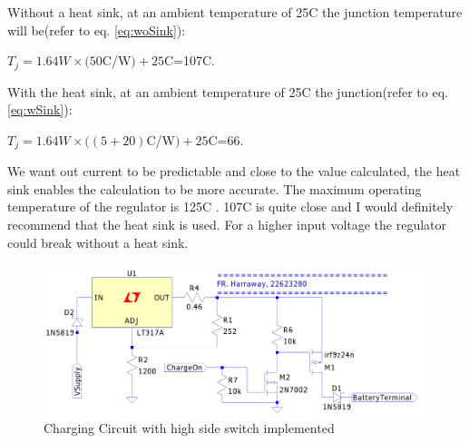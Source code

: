 Without a heat sink, at an ambient temperature of 25\textdegree C the junction temperature will be(refer to eq. \ref{eq:woSink}):

\begin{center}
$T_j=1.64W\times(50$\textdegree C/W$)+25$\textdegree C=107\textdegree C. 
\end{center}

With the heat sink, at an ambient temperature of 25\textdegree C the junction(refer to eq. \ref{eq:wSink}):
\begin{center}
    $T_j=1.64W\times((5+20)$\textdegree C/W$)+25$\textdegree C=66\textdegree.
\end{center}

We want out current to be predictable and close to the value calculated, the heat sink enables the calculation to be more accurate. The maximum operating temperature of the regulator is 125\textdegree C \cite{STM}. 107\textdegree C is quite close and I would definitely recommend that the heat sink is used. For a higher input voltage the regulator could break without a heat sink. 


\begin{figure}[!htb]
\centering
\includegraphics[scale=0.18]{Figures/FinCirc.png}
\caption{Charging Circuit with high side switch implemented }
\label{fig:circuit}
\end{figure}


